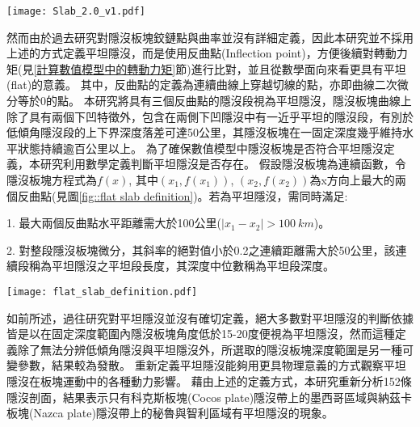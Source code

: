\begin{figure*}[ht!]
    \centering
    \texttt{[image: Slab\_2.0\_v1.pdf]}
    \caption[slab 2.0 模型與四條參考剖面，改編自\citet{schellart2020control}]{slab 2.0 模型與四條參考剖面，改編自\citet{schellart2020control}。其中(a)為馬尼拉隱沒帶剖面，(b)為阿拉斯加隱沒帶剖面，(c)為加勒比板塊隱沒帶剖面，(d)為秘魯隱沒帶剖面。}
    \label{fig::slab profile}
\end{figure*}


然而由於過去研究對隱沒板塊鉸鏈點與曲率並沒有詳細定義，因此本研究並不採用上述的方式定義平坦隱沒，而是使用反曲點(Inflection point)，方便後續對轉動力矩(見\ref{計算數值模型中的轉動力矩}節)進行比對，並且從數學面向來看更具有平坦(flat)的意義。
其中，反曲點的定義為連續曲線上穿越切線的點，亦即曲線二次微分等於0的點。
本研究將具有三個反曲點的隱沒段視為平坦隱沒，隱沒板塊曲線上除了具有兩個下凹特徵外，包含在兩側下凹隱沒中有一近乎平坦的隱沒段，有別於低傾角隱沒段的上下界深度落差可達50公里，其隱沒板塊在一固定深度幾乎維持水平狀態持續逾百公里以上。
為了確保數值模型中隱沒板塊是否符合平坦隱沒定義，本研究利用數學定義判斷平坦隱沒是否存在。
假設隱沒板塊為連續函數，令隱沒板塊方程式為$f(x)$, 其中$(x_{1},f(x_{1}))$, $(x_{2},f(x_{2}))$為x方向上最大的兩個反曲點(見圖\ref{fig::flat slab definition})。若為平坦隱沒，需同時滿足:

1. 最大兩個反曲點水平距離需大於100公里($\mid x_{1}-x_{2}\mid > 100 \ km$)。

2. 對整段隱沒板塊微分，其斜率的絕對值小於0.2之連續距離需大於50公里，該連續段稱為平坦隱沒之平坦段長度，其深度中位數稱為平坦段深度。

\begin{figure*}[ht!]
    \centering
    \texttt{[image: flat\_slab\_definition.pdf]}
    \caption[本研究中平坦隱沒的定義示意圖]{本研究中平坦隱沒的定義示意圖。綠色點表示隱沒板塊頂部上的反曲點，藍色點為隱沒板塊頂部上斜率絕對值小於0.2內最大連續範圍段的起點與終點。}
    \label{fig::flat slab definition}
\end{figure*}

如前所述，過往研究對平坦隱沒並沒有確切定義，絕大多數對平坦隱沒的判斷依據皆是以在固定深度範圍內隱沒板塊角度低於15-20度便視為平坦隱沒，然而這種定義除了無法分辨低傾角隱沒與平坦隱沒外，所選取的隱沒板塊深度範圍是另一種可變參數，結果較為發散。
重新定義平坦隱沒能夠用更具物理意義的方式觀察平坦隱沒在板塊運動中的各種動力影響。
藉由上述的定義方式，本研究重新分析152條隱沒剖面，結果表示只有科克斯板塊(Cocos plate)隱沒帶上的墨西哥區域與納茲卡板塊(Nazca plate)隱沒帶上的秘魯與智利區域有平坦隱沒的現象。

